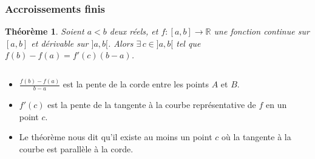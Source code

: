 \documentclass[10pt,notheorems]{beamer}
\theoremstyle{plain}
\newtheorem{theorem}{Théorème}
\theoremstyle{definition} %
\begin{document}
\begin{frame}
  \frametitle{Accroissements finis}
  \hypertarget{slide_accroissements_finis_1}{}

  \begin{theorem}\label{thm:accroissements_finis}
    Soient $a<b$ deux réels, et $f: [a,b]\rightarrow \mathbb R$ une fonction continue sur $[a, b]$ et dérivable sur $]a, b[$. Alors $\exists\, c\in]a, b[$ tel que $f(b)-f(a) = f'(c)(b-a)$.
  \end{theorem}

  \bigskip

  \begin{columns}[onlytextwidth]
    \begin{column}{0.5\textwidth}
      {\small
        \begin{itemize}
        \item $\frac{f(b)-f(a)}{b-a}$ est la pente de la corde entre les points $A$ et $B$.\newline
        \item $f'(c)$ est la pente de la tangente à la courbe représentative de $f$ en un point $c$.\newline
        \item Le théorème nous dit qu'il existe au moins un point $c$ où la tangente à la courbe est parallèle à la corde.
        \end{itemize}}
    \end{column}
    \begin{column}{0.5\textwidth}
      \begin{center}
        {\small
          }
\end{center}
\end{column}
\end{columns}
\end{frame}
\end{document}
